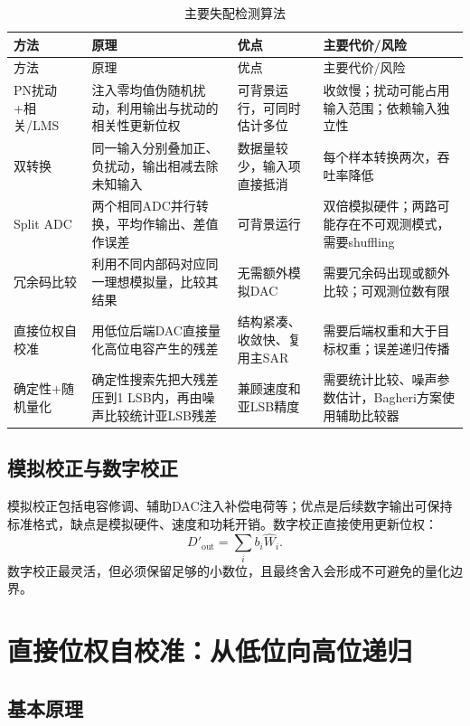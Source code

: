 \documentclass[UTF8,a4paper,11pt]{ctexart}
\begin{document}
\begin{longtable}{p{3.0cm}p{4.3cm}p{4.0cm}p{3.0cm}}
\caption{主要失配检测算法}\label{tab:cal_methods}\\
\toprule
方法 & 原理 & 优点 & 主要代价/风险\\
\midrule
\endfirsthead
\toprule
方法 & 原理 & 优点 & 主要代价/风险\\
\midrule
\endhead
PN扰动+相关/LMS & 注入零均值伪随机扰动，利用输出与扰动的相关性更新位权 & 可背景运行，可同时估计多位 & 收敛慢；扰动可能占用输入范围；依赖输入独立性\\
双转换 & 同一输入分别叠加正、负扰动，输出相减去除未知输入 & 数据量较少，输入项直接抵消 & 每个样本转换两次，吞吐率降低\\
Split ADC & 两个相同ADC并行转换，平均作输出、差值作误差 & 可背景运行 & 双倍模拟硬件；两路可能存在不可观测模式，需要shuffling\\
冗余码比较 & 利用不同内部码对应同一理想模拟量，比较其结果 & 无需额外模拟DAC & 需要冗余码出现或额外比较；可观测位数有限\\
直接位权自校准 & 用低位后端DAC直接量化高位电容产生的残差 & 结构紧凑、收敛快、复用主SAR & 需要后端权重和大于目标权重；误差递归传播\\
确定性+随机量化 & 确定性搜索先把大残差压到1 LSB内，再由噪声比较统计亚LSB残差 & 兼顾速度和亚LSB精度 & 需要统计比较、噪声参数估计，Bagheri方案使用辅助比较器\\
\bottomrule
\end{longtable}

\subsection{模拟校正与数字校正}

模拟校正包括电容修调、辅助DAC注入补偿电荷等；优点是后续数字输出可保持标准格式，缺点是模拟硬件、速度和功耗开销。数字校正直接使用更新位权：
\begin{equation}
D'_{\mathrm{out}}=\sum_i b_i\widehat W_i.
\label{eq:digital_correction}
\end{equation}
数字校正最灵活，但必须保留足够的小数位，且最终舍入会形成不可避免的量化边界。

\section{直接位权自校准：从低位向高位递归}

\subsection{基本原理}
\end{document}
